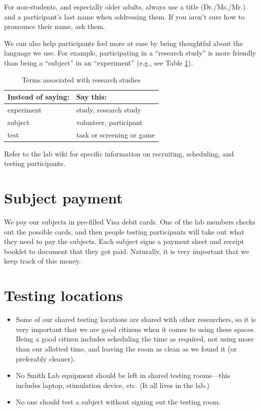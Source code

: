 \documentclass[letterpaper,12pt,oneside]{memoir}
\begin{document}
For non-students, and especially older adults, always use a title (Dr./Ms./Mr.) and a participant's last name when addressing them. If you aren't sure how to pronounce their name, ask them.

We can also help participants feel more at ease by being thoughtful about the language we use. For example, participating in a ``research study'' is more friendly than being a ``subject'' in an ``experiment'' (e.g., see Table \ref{table:terms}).

\begin{table}
\centering
\caption{Terms associated with research studies}
\begin{tabular}{ll}
\toprule
Instead of saying: & Say this:\\
\midrule
experiment& study, research study\\
subject& volunteer, participant\\
test & task or screening or game \\
\bottomrule
\end{tabular}
\label{table:terms}
\end{table}

Refer to the lab wiki for specific information on recruiting, scheduling, and testing participants.


\section{Subject payment}
\label{sec:subject_payment}

We pay our subjects in pre-filled Visa debit cards. One of the lab members checks out the possible cards, and then people testing participants will take out what they need to pay the subjects. Each subject signs a payment sheet and receipt booklet to document that they got paid. Naturally, it is very important that we keep track of this money.



\section{Testing locations}
\label{sec:testing_locations}

\begin{itemize}
\item Some of our shared testing locations are shared with other researchers, so it is very important that we are good citizens when it comes to using these spaces. Being a good citizen includes scheduling the time as required, not using more than our allotted time, and leaving the room as clean as we found it (or preferably cleaner).
\item No Smith Lab equipment should be left in shared testing rooms---this includes laptop, stimulation device, etc. (It all lives in the lab.)
\item No one should test a subject without signing out the testing room.
\end{itemize}
\end{document}
